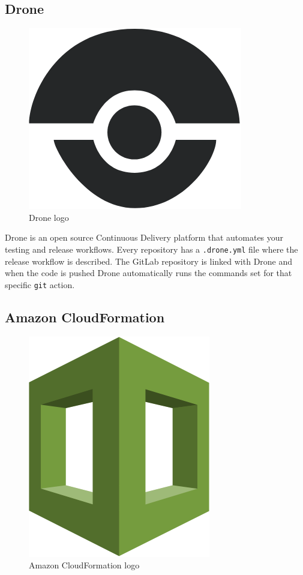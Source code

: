 \subsection*{Drone}

\begin{figure}[H]
\centering
\includegraphics[scale=0.1]{resources/drone-logo.png}
\caption{Drone logo}
\end{figure}

Drone\cite{drone} is an open source Continuous Delivery platform that automates your testing and release workflows. Every repository has a \texttt{.drone.yml} file where the release workflow is described. The GitLab repository is linked with Drone and when the code is pushed Drone automatically runs the commands set for that specific \texttt{git} action.

\subsection*{Amazon CloudFormation}

\begin{figure}[H]
\centering
\includegraphics[scale=0.1]{resources/cf-logo.png}
\caption{Amazon CloudFormation logo}
\end{figure}


